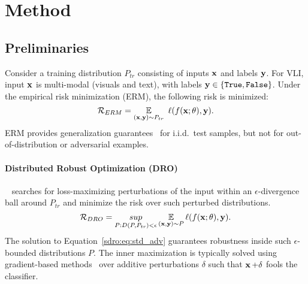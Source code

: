 \section{Method} 


\subsection{Preliminaries}
Consider a training distribution $P_{tr}$ consisting of inputs $\operatorname{\mathbf{x}}$ and labels $\operatorname{\mathbf{y}}$.
For VLI, input $\operatorname{\mathbf{x}}$ is multi-modal (visuals and text), with labels $\operatorname{\mathbf{y}} \in \{\texttt{True}, \texttt{False}\}$.
Under the empirical risk minimization (ERM), the following risk is minimized:
\begin{equation}
    \mathcal{R}_{ERM} = \operatorname*{\mathbb{E}}_{(\operatorname{\mathbf{x}}, \operatorname{\mathbf{y}}) \sim P_{tr}}  ~\ell(f(\operatorname{\mathbf{x}}; \theta), \operatorname{\mathbf{y}}).
    \label{sdro:eq:erm}
\end{equation}
ERM provides generalization guarantees~\citep{vapnik1991principles} for i.i.d.\ test samples, but not for out-of-distribution or adversarial examples.

\paragraph{Distributed Robust Optimization (DRO)}~\citep{pmlr-v80-hu18a,sagawa2020distributionally} searches for loss-maximizing perturbations of the input within an $\epsilon$-divergence ball around $P_{tr}$ and minimize the risk over such perturbed distributions.
\begin{equation}
    \mathcal{R}_{DRO}=\underset{P:D(P, P_{tr})<\epsilon}{sup}\operatorname*{\mathbb{E}}_{(\operatorname{\mathbf{x}}, \operatorname{\mathbf{y}}) \sim P} \ell(f(\operatorname{\mathbf{x}}; \theta), \operatorname{\mathbf{y}}).
    \label{sdro:eq:std_adv}
\end{equation}
The solution to Equation~\ref{sdro:eq:std_adv} guarantees robustness inside such $\epsilon$-bounded distributions $P$.
The inner maximization is typically solved using gradient-based methods~\citep{madry2018towards} over additive perturbations $\delta$ such that $\operatorname{\mathbf{x}}+\delta$ fools the classifier.


